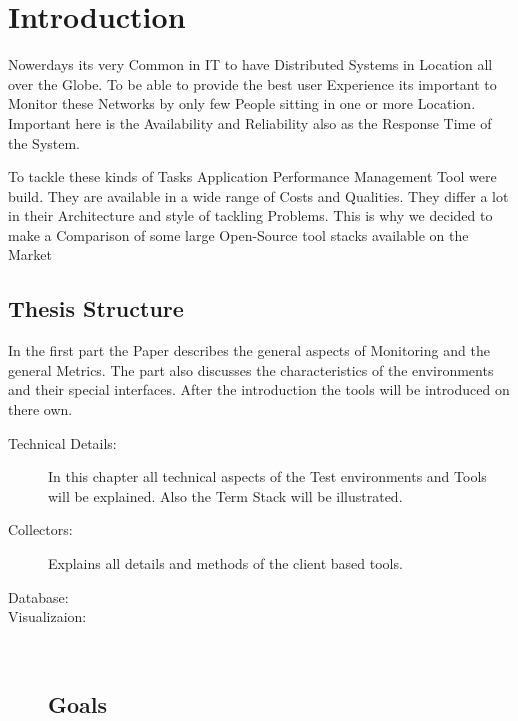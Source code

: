 
\chapter{Introduction}
Nowerdays its very Common in IT to have Distributed Systems in Location all over the Globe. To be able to provide the best user Experience its important to Monitor these Networks by only few People sitting in one or more Location. Important here is the Availability and Reliability also as the Response Time of the System. 

To tackle these kinds of Tasks Application Performance Management Tool were build. They are available in a wide range of Costs and Qualities. They differ a lot in their Architecture and style of tackling Problems. This is why we decided to make a Comparison of some large Open-Source tool stacks available on the Market 


\section*{Thesis Structure}
In the first part the Paper describes the general aspects of Monitoring and the general Metrics. The part also discusses the characteristics of the environments and their special interfaces. After the introduction the tools will be introduced on there own. 
\begin{description}
\item[Technical Details:] In this chapter all technical aspects of the Test environments and Tools will be explained. Also the Term Stack will be illustrated.  
\item[Collectors:] Explains all details and methods of the client based tools.
\item[Database:] 
\item[Visualizaion:]      \\
\section*{Goals}
\end{description}
